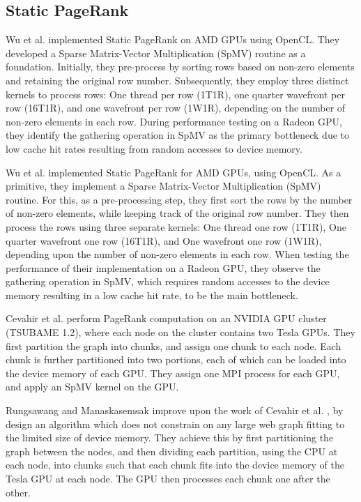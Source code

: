 \subsection{Static PageRank}

Wu et al. \cite{rank-wu10} implemented Static PageRank on AMD GPUs using OpenCL. They developed a Sparse Matrix-Vector Multiplication (SpMV) routine as a foundation. Initially, they pre-process by sorting rows based on non-zero elements and retaining the original row number. Subsequently, they employ three distinct kernels to process rows: One thread per row (1T1R), one quarter wavefront per row (16T1R), and one wavefront per row (1W1R), depending on the number of non-zero elements in each row. During performance testing on a Radeon GPU, they identify the gathering operation in SpMV as the primary bottleneck due to low cache hit rates resulting from random accesses to device memory.

Wu et al. \cite{rank-wu10} implemented Static PageRank for AMD GPUs, using OpenCL. As a primitive, they implement a Sparse Matrix-Vector Multiplication (SpMV) routine. For this, as a pre-processing step, they first sort the rows by the number of non-zero elements, while keeping track of the original row number. They then process the rows using three separate kernels: One thread one row (1T1R), One quarter wavefront one row (16T1R), and One wavefront one row (1W1R), depending upon the number of non-zero elements in each row. When testing the performance of their implementation on a Radeon GPU, they observe the gathering operation in SpMV, which requires random accesses to the device memory resulting in a low cache hit rate, to be the main bottleneck.

Cevahir et al. \cite{cevahir2010efficient} perform PageRank computation on an NVIDIA GPU cluster (TSUBAME 1.2), where each node on the cluster contains two Tesla GPUs. They first partition the graph into chunks, and assign one chunk to each node. Each chunk is further partitioned into two portions, each of which can be loaded into the device memory of each GPU. They assign one MPI process for each GPU, and apply an SpMV kernel on the GPU.

Rungsawang and Manaskasemsak \cite{rank-rungsawang12} improve upon the work of Cevahir et al. \cite{cevahir2010efficient}, by design an algorithm which does not constrain on any large web graph fitting to the limited size of device memory. They achieve this by first partitioning the graph between the nodes, and then dividing each partition, using the CPU at each node, into chunks such that each chunk fits into the device memory of the Tesla GPU at each node. The GPU then processes each chunk one after the other.

